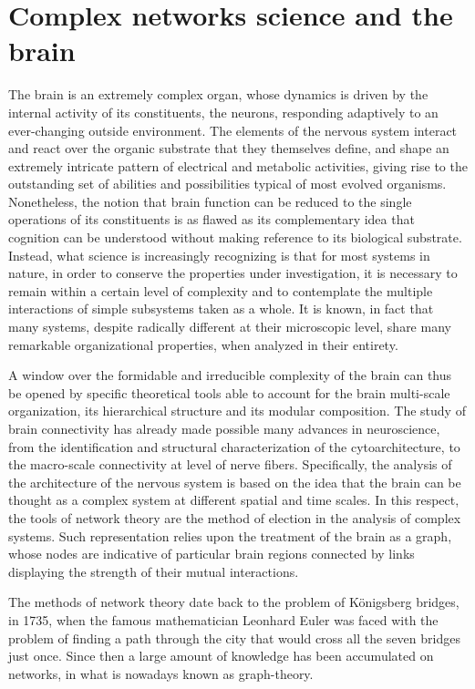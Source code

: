 \section{Complex networks science and the brain}
The brain is an extremely complex organ, whose dynamics is driven by the internal activity of its constituents, the neurons, responding adaptively to an ever-changing outside environment.
The elements of the nervous system interact and react over the organic substrate that they themselves define, and shape an extremely intricate pattern of electrical and metabolic activities, giving rise to the outstanding set of abilities and possibilities typical of most evolved organisms.
Nonetheless, the notion that brain function can be reduced to the single operations of its constituents is as flawed as its complementary idea that cognition can be understood without making reference to its biological substrate.
Instead, what science is increasingly recognizing is that for most systems in nature, in order to conserve the properties under investigation, it is necessary to remain within a certain level of complexity and to contemplate the multiple interactions of simple subsystems taken as a whole. It is known, in fact that many systems, despite radically different at their microscopic level, share many remarkable organizational properties, when analyzed in their entirety.

A window over the formidable and irreducible complexity of the brain can thus be opened by specific theoretical tools able to account for the brain multi-scale organization, its hierarchical structure and its modular composition.
The study of brain connectivity has already made possible many advances in neuroscience, from the identification and structural characterization of the cytoarchitecture, to the macro-scale connectivity at level of nerve fibers.
Specifically, the analysis of the architecture of the nervous system is based on the idea that the brain can be thought as a complex system at different spatial and time scales. In this respect, the tools of network theory are the method of election in the analysis of complex systems.
Such representation relies upon the treatment of the brain as a graph, whose nodes are indicative of particular brain regions connected by links displaying the strength of their mutual interactions.
\bigbreak

The methods of network theory date back to the problem of K{\"o}nigsberg bridges, in 1735, when the famous mathematician Leonhard Euler was faced with the problem of finding a path through the city that would cross all the seven bridges just once.
Since then a large amount of knowledge has been accumulated on networks, in what is nowadays known as graph-theory.

